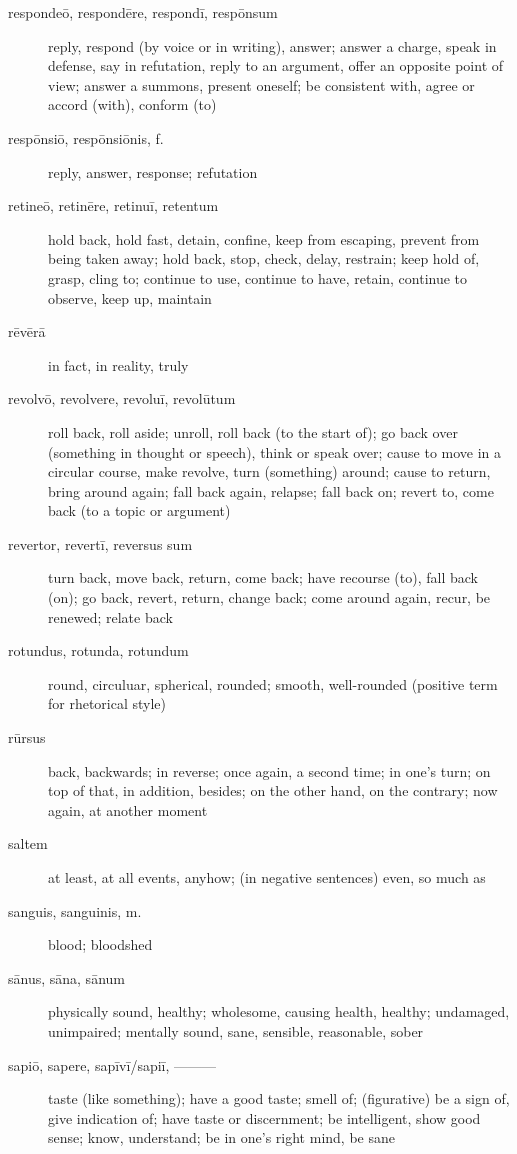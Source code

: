 \begin{description}
    \item[respondeō, respondēre, respondī, respōnsum] \marginnote{*}reply, respond (by voice or in writing), answer; answer a charge, speak in defense, say in refutation, reply to an argument, offer an opposite point of view; answer a summons, present oneself; be consistent with, agree or accord (with), conform (to)
    \item[respōnsiō, respōnsiōnis, f.] reply, answer, response; refutation
    \item[retineō, retinēre, retinuī, retentum] \marginnote{*}hold back, hold fast, detain, confine, keep from escaping, prevent from being taken away; hold back, stop, check, delay, restrain; keep hold of, grasp, cling to; continue to use, continue to have, retain, continue to observe, keep up, maintain
    \item[rēvērā] \marginnote{*}in fact, in reality, truly
    \item[revolvō, revolvere, revoluī, revolūtum] roll back, roll aside; unroll, roll back (to the start of); go back over (something in thought or speech), think or speak over; cause to move in a circular course, make revolve, turn (something) around; cause to return, bring around again; fall back again, relapse; fall back on; revert to, come back (to a topic or argument)
    \item[revertor, revertī, reversus sum] turn back, move back, return, come back; have recourse (to), fall back (on); go back, revert, return, change back; come around again, recur, be renewed; relate back
    \item[rotundus, rotunda, rotundum] round, circuluar, spherical, rounded; smooth, well-rounded (positive term for rhetorical style)
    \item[rūrsus] \marginnote{*}back, backwards; in reverse; once again, a second time; in one's turn; on top of that, in addition, besides; on the other hand, on the contrary; now again, at another moment
    \item[saltem] at least, at all events, anyhow; (in negative sentences) even, so much as
    \item[sanguis, sanguinis, m.] \marginnote{*}blood; bloodshed
    \item[sānus, sāna, sānum] \marginnote{*}physically sound, healthy; wholesome, causing health, healthy; undamaged, unimpaired; mentally sound, sane, sensible, reasonable, sober
    \item[sapiō, sapere, sapīvī/sapiī, ———] taste (like something); have a good taste; smell of; (figurative) be a sign of, give indication of; have taste or discernment; be intelligent, show good sense; know, understand; be in one's right mind, be sane

\end{description}
